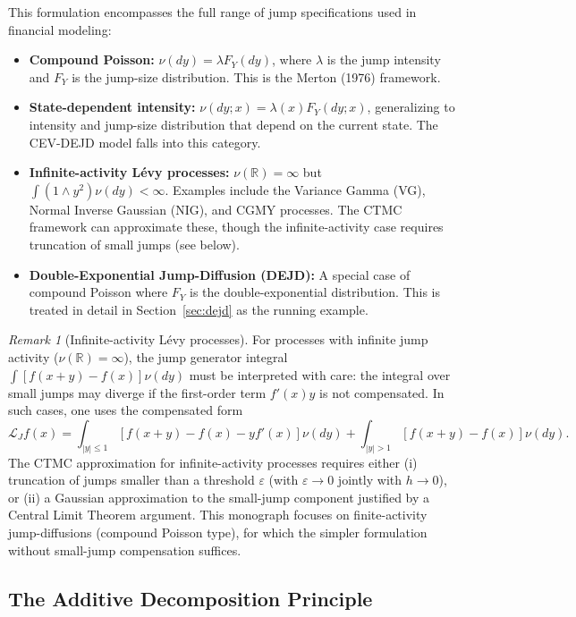 \documentclass[11pt,a4paper,openany]{book}
\theoremstyle{definition}
\theoremstyle{plain}
\theoremstyle{remark}
\newtheorem{remark}[theorem]{Remark}
\newcommand{\1}{\mathbbm{1}}
\newcommand{\R}{\mathbb{R}}
\begin{document}
This formulation encompasses the full range of jump specifications used in financial modeling:
\begin{itemize}
    \item \textbf{Compound Poisson:} $\nu(dy) = \lambda F_{Y}(dy)$, where $\lambda$ is the jump intensity and $F_{Y}$ is the jump-size distribution. This is the Merton (1976) framework.
    \item \textbf{State-dependent intensity:} $\nu(dy; x) = \lambda(x) F_{Y}(dy; x)$, generalizing to intensity and jump-size distribution that depend on the current state. The CEV-DEJD model falls into this category.
    \item \textbf{Infinite-activity L\'{e}vy processes:} $\nu(\R) = \infty$ but $\int (1 \wedge y^{2}) \nu(dy) < \infty$. Examples include the Variance Gamma (VG), Normal Inverse Gaussian (NIG), and CGMY processes. The CTMC framework can approximate these, though the infinite-activity case requires truncation of small jumps (see below).
    \item \textbf{Double-Exponential Jump-Diffusion (DEJD):} A special case of compound Poisson where $F_{Y}$ is the double-exponential distribution. This is treated in detail in Section~\ref{sec:dejd} as the running example.
\end{itemize}

\begin{remark}[Infinite-activity L\'{e}vy processes]
For processes with infinite jump activity ($\nu(\R) = \infty$), the jump generator integral $\int [f(x+y) - f(x)] \nu(dy)$ must be interpreted with care: the integral over small jumps may diverge if the first-order term $f'(x)y$ is not compensated. In such cases, one uses the compensated form
\[
\mathcal{L}_{J} f(x) = \int_{|y| \leq 1} [f(x+y) - f(x) - y f'(x)] \nu(dy) + \int_{|y| > 1} [f(x+y) - f(x)] \nu(dy).
\]
The CTMC approximation for infinite-activity processes requires either (i) truncation of jumps smaller than a threshold $\varepsilon$ (with $\varepsilon \to 0$ jointly with $h \to 0$), or (ii) a Gaussian approximation to the small-jump component justified by a Central Limit Theorem argument. This monograph focuses on finite-activity jump-diffusions (compound Poisson type), for which the simpler formulation without small-jump compensation suffices.
\end{remark}

\subsection{The Additive Decomposition Principle}
\end{document}
